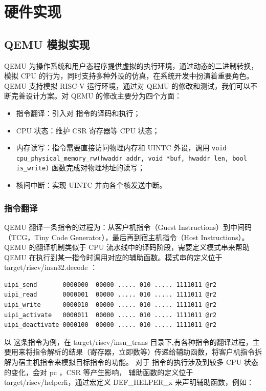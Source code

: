 
\chapter{硬件实现}

\section{QEMU 模拟实现}

QEMU \cite{qemu} 为操作系统和用户态程序提供虚拟的执行环境，通过动态的二进制转换，模拟 CPU 的行为，同时支持多种外设的仿真，在系统开发中扮演着重要角色。
QEMU 支持模拟 RISC-V 运行环境，通过对 QEMU 的修改和测试，我们可以不断完善设计方案。对 QEMU 的修改主要分为四个方面：

\begin{itemize}
    \item 指令翻译：引入对 \Iuipi 指令的译码和执行；
    \item CPU 状态：维护 CSR 寄存器等 CPU 状态；
    \item 内存读写：\Iuipi 指令需要直接访问物理内存和 UINTC 外设，调用 \texttt{void cpu_physical_memory_rw(hwaddr addr, void *buf, hwaddr len, bool is_write)} 函数完成对物理地址的读写；
    \item 核间中断：实现 UINTC 并向各个核发送中断。
\end{itemize}

\subsection{指令翻译}

QEMU 翻译一条指令的过程为：从客户机指令（Guest Instructions）到中间码（TCG，Tiny Code Generator），最后再到宿主机指令（Host Instructions）。
QEMU 的翻译机制类似于 CPU 流水线中的译码阶段，需要定义模式串来帮助 QEMU 在执行到某一指令时调用对应的辅助函数。模式串的定义位于 target/riscv/insn32.decode ：

\begin{lstlisting}
uipi_send       0000000  00000 ..... 010 ..... 1111011 @r2
uipi_read       0000001  00000 ..... 010 ..... 1111011 @r2
uipi_write      0000010  00000 ..... 010 ..... 1111011 @r2
uipi_activate   0000011  00000 ..... 010 ..... 1111011 @r2
uipi_deactivate 0000100  00000 ..... 010 ..... 1111011 @r2
\end{lstlisting}

以 \Iuret 这条指令为例，在 target/riscv/insn\_trans 目录下,有各种指令的翻译过程，主要用来将指令解析的结果（寄存器，立即数等）传递给辅助函数，将客户机指令拆解为宿主机指令来模拟目标指令的功能。
对于 \Iuret 指令的执行涉及到较多 CPU 状态的变化，会对 pc ，CSR 等产生影响， 辅助函数的定义位于 target/riscv/helper\.h，通过宏定义 DEF\_HELPER\_x 来声明辅助函数，例如：

